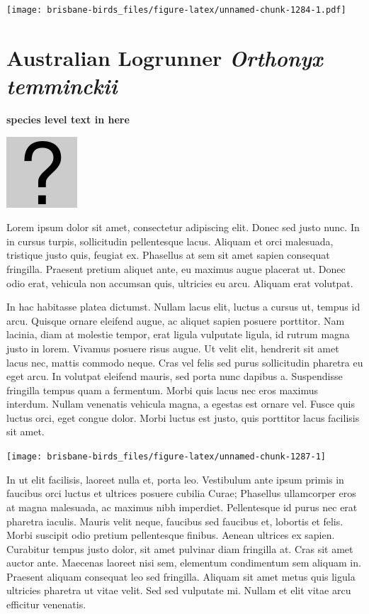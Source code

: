 \documentclass[]{book}
\let\origfigure\figure
\let\endorigfigure\endfigure
\renewenvironment{figure}[1][2] {
  \expandafter\origfigure\expandafter[H]
} {
  \endorigfigure
}
\begin{document}
\texttt{[image: brisbane-birds\_files/figure-latex/unnamed-chunk-1284-1.pdf]}

\section{\texorpdfstring{Australian Logrunner \emph{Orthonyx
temminckii}}{Australian Logrunner Orthonyx temminckii}}\label{australian-logrunner-orthonyx-temminckii}

\textbf{species level text in here}

\begin{figure}
\centering
\includegraphics{assets/missing.png}
\caption{No image for species}
\end{figure}

Lorem ipsum dolor sit amet, consectetur adipiscing elit. Donec sed justo
nunc. In in cursus turpis, sollicitudin pellentesque lacus. Aliquam et
orci malesuada, tristique justo quis, feugiat ex. Phasellus at sem sit
amet sapien consequat fringilla. Praesent pretium aliquet ante, eu
maximus augue placerat ut. Donec odio erat, vehicula non accumsan quis,
ultricies eu arcu. Aliquam erat volutpat.

In hac habitasse platea dictumst. Nullam lacus elit, luctus a cursus ut,
tempus id arcu. Quisque ornare eleifend augue, ac aliquet sapien posuere
porttitor. Nam lacinia, diam at molestie tempor, erat ligula vulputate
ligula, id rutrum magna justo in lorem. Vivamus posuere risus augue. Ut
velit elit, hendrerit sit amet lacus nec, mattis commodo neque. Cras vel
felis sed purus sollicitudin pharetra eu eget arcu. In volutpat eleifend
mauris, sed porta nunc dapibus a. Suspendisse fringilla tempus quam a
fermentum. Morbi quis lacus nec eros maximus interdum. Nullam venenatis
vehicula magna, a egestas est ornare vel. Fusce quis luctus orci, eget
congue dolor. Morbi luctus est justo, quis porttitor lacus facilisis sit
amet.

\begin{figure}
\texttt{[image: brisbane-birds\_files/figure-latex/unnamed-chunk-1287-1]} \caption{insert figure caption}\label{fig:unnamed-chunk-1287}
\end{figure}

In ut elit facilisis, laoreet nulla et, porta leo. Vestibulum ante ipsum
primis in faucibus orci luctus et ultrices posuere cubilia Curae;
Phasellus ullamcorper eros at magna malesuada, ac maximus nibh
imperdiet. Pellentesque id purus nec erat pharetra iaculis. Mauris velit
neque, faucibus sed faucibus et, lobortis et felis. Morbi suscipit odio
pretium pellentesque finibus. Aenean ultrices ex sapien. Curabitur
tempus justo dolor, sit amet pulvinar diam fringilla at. Cras sit amet
auctor ante. Maecenas laoreet nisi sem, elementum condimentum sem
aliquam in. Praesent aliquam consequat leo sed fringilla. Aliquam sit
amet metus quis ligula ultricies pharetra ut vitae velit. Sed sed
vulputate mi. Nullam et elit vitae arcu efficitur venenatis.
\end{document}
